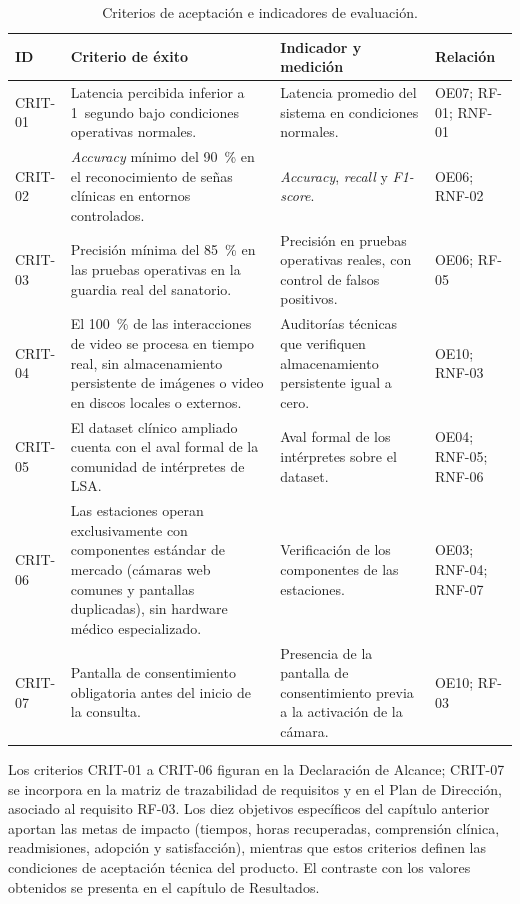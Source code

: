 \begin{table}[htbp]
\centering
\caption{Criterios de aceptación e indicadores de evaluación.}\label{tab:crit}
\footnotesize
\begin{tabularx}{\textwidth}{@{}lXXl@{}}
\toprule
\textbf{ID} & \textbf{Criterio de éxito} & \textbf{Indicador y medición} & \textbf{Relación} \\
\midrule
CRIT-01 & Latencia percibida inferior a 1~segundo bajo condiciones operativas normales. & Latencia promedio del sistema en condiciones normales. & OE07; RF-01; RNF-01 \\
CRIT-02 & \emph{Accuracy} mínimo del 90~\% en el reconocimiento de señas clínicas en entornos controlados. & \emph{Accuracy}, \emph{recall} y \emph{F1-score}. & OE06; RNF-02 \\
CRIT-03 & Precisión mínima del 85~\% en las pruebas operativas en la guardia real del sanatorio. & Precisión en pruebas operativas reales, con control de falsos positivos. & OE06; RF-05 \\
CRIT-04 & El 100~\% de las interacciones de video se procesa en tiempo real, sin almacenamiento persistente de imágenes o video en discos locales o externos. & Auditorías técnicas que verifiquen almacenamiento persistente igual a cero. & OE10; RNF-03 \\
CRIT-05 & El dataset clínico ampliado cuenta con el aval formal de la comunidad de intérpretes de LSA. & Aval formal de los intérpretes sobre el dataset. & OE04; RNF-05; RNF-06 \\
CRIT-06 & Las estaciones operan exclusivamente con componentes estándar de mercado (cámaras web comunes y pantallas duplicadas), sin hardware médico especializado. & Verificación de los componentes de las estaciones. & OE03; RNF-04; RNF-07 \\
CRIT-07 & Pantalla de consentimiento obligatoria antes del inicio de la consulta. & Presencia de la pantalla de consentimiento previa a la activación de la cámara. & OE10; RF-03 \\
\bottomrule
\end{tabularx}
\end{table}

Los criterios CRIT-01 a CRIT-06 figuran en la Declaración de Alcance; CRIT-07 se incorpora en la matriz de trazabilidad de requisitos y en el Plan de Dirección, asociado al requisito RF-03. Los diez objetivos específicos del capítulo anterior aportan las metas de impacto (tiempos, horas recuperadas, comprensión clínica, readmisiones, adopción y satisfacción), mientras que estos criterios definen las condiciones de aceptación técnica del producto. El contraste con los valores obtenidos se presenta en el capítulo de Resultados.

